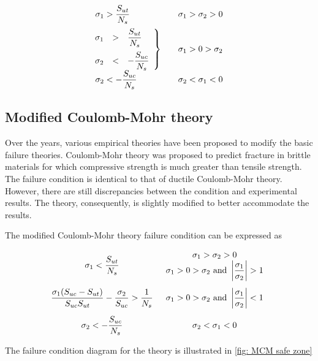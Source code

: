 \documentclass[a4paper,openany,12pt]{book}
\begin{document}
$$\begin{array}{l l l}
  \sigma_1 > \dfrac{S_{ut}}{N_s} & & \sigma_1 > \sigma_2 > 0 \\[10pt]
  \left. \hspace{-0.23cm}
  \begin{array}{l l l}
    \sigma_1 & > & \dfrac{S_{ut}}{N_s} \\[10pt]
    \sigma_2 & < & -\dfrac{S_{uc}}{N_s}
    \end{array} \right\} & & \sigma_1 > 0 > \sigma_2 \\[10pt]
    \sigma_2 <  - \dfrac{S_{uc}}{N_s} & & \sigma _2 < \sigma _1 < 0
  \end{array}$$

\subsection{Modified Coulomb-Mohr theory}
\label{modified-coulomb-mohr-theory}
Over the years, various empirical theories have been proposed to modify
the basic failure theories. Coulomb-Mohr theory was proposed to predict
fracture in brittle materials for which compressive strength is much
greater than tensile strength. The failure condition is identical to
that of ductile Coulomb-Mohr theory. However, there are still
discrepancies between the condition and experimental results. The
theory, consequently, is slightly modified to better accommodate the
results.

The modified Coulomb-Mohr theory failure condition can be expressed as

$$\begin{array}{c c}
    \sigma_1 < \dfrac{S_{ut}}{N_s} &
      \begin{array}{c}
        \sigma_1 > \sigma_2 > 0 \\ 
        \sigma_1 > 0 > \sigma_2 \text{ and } \left| \dfrac{\sigma_1}{\sigma_2} \right| > 1 
      \end{array} \\[20pt]
    \dfrac{\sigma_1(S_{uc} - S_{ut})}{S_{uc}S_{ut}} - \dfrac{\sigma_2}{S_{uc}} >
      \dfrac{1}{N_s} & \sigma_1 > 0 > \sigma_2\text{ and }\left| \dfrac{\sigma_1}{\sigma_2} \right| < 1 \\[15pt]
    \sigma_2 <  -\dfrac{S_{uc}}{N_s} & \sigma_2 < \sigma_1 < 0 
  \end{array}$$

The failure condition diagram for the theory is illustrated in
\ref{fig: MCM safe zone}
\end{document}
